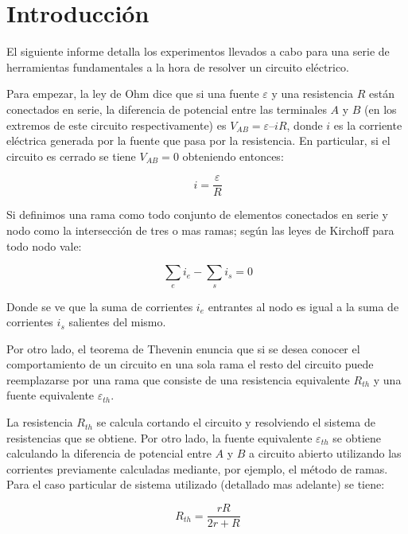 \documentclass[11pt,a4paper]{article}
\begin{document}
\section{Introducción}\label{sec:intro}
El siguiente informe detalla los experimentos llevados a cabo para una serie de herramientas fundamentales a la hora de resolver un circuito eléctrico. 

Para empezar, la ley de Ohm \cite{Trelles} dice que si una fuente $\varepsilon$ y una resistencia $R$ están conectados en serie, la diferencia de potencial entre las terminales $A$ y $B$ (en los extremos de este circuito respectivamente) es $V_{AB} = \varepsilon –iR$, donde $i$ es la corriente eléctrica generada por la fuente que pasa por la resistencia. En particular, si el circuito es cerrado se tiene $V_{AB}=0$ obteniendo entonces:

\begin{equation}\label{Ohm}
\ i= \frac{\varepsilon}{R}
\end{equation}

Si definimos una rama como todo conjunto de elementos conectados en serie y nodo como la intersección de tres o mas ramas; según las leyes de Kirchoff \cite{Trelles} para todo nodo vale:
 
\begin{equation}\label{nodos}
\ \sum_{e}i_{e}-\sum_{s}i_{s}=0
\end{equation}

Donde se ve que la suma de corrientes $i_{e}$ entrantes al nodo es igual a la suma de corrientes $i_{s}$ salientes del mismo.

Por otro lado, el teorema de Thevenin \cite{Trelles} enuncia que si se desea conocer el comportamiento de un circuito en una sola rama el resto del circuito puede reemplazarse por una rama que consiste de una resistencia equivalente $R_{th}$ y una fuente equivalente $\varepsilon_{th}$.

La resistencia $R_{th}$ se calcula cortando el circuito y resolviendo el sistema de resistencias que se obtiene. Por otro lado, la fuente equivalente $\varepsilon_{th}$ se obtiene calculando la diferencia de potencial entre $A$ y $B$ a circuito abierto utilizando las corrientes previamente calculadas mediante, por ejemplo, el método de ramas. Para el caso particular de sistema utilizado (detallado mas adelante) se tiene:

\begin{equation}\label{Rth}
\ R_{th}= \frac{rR}{2r+R}
\end{equation}
\end{document}
